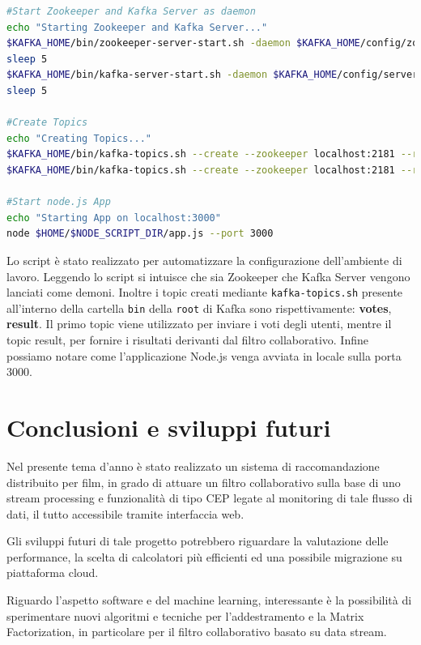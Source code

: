 \documentclass[12pt]{article}
\begin{document}
\begin{itemize}
\begin{lstlisting}[language=bash,caption=start.sh]
#Start Zookeeper and Kafka Server as daemon
echo "Starting Zookeeper and Kafka Server..."
$KAFKA_HOME/bin/zookeeper-server-start.sh -daemon $KAFKA_HOME/config/zookeeper.properties
sleep 5
$KAFKA_HOME/bin/kafka-server-start.sh -daemon $KAFKA_HOME/config/server.properties
sleep 5

#Create Topics
echo "Creating Topics..."
$KAFKA_HOME/bin/kafka-topics.sh --create --zookeeper localhost:2181 --replication-factor 1 --partitions 1 --topic votes
$KAFKA_HOME/bin/kafka-topics.sh --create --zookeeper localhost:2181 --replication-factor 1 --partitions 1 --topic result

#Start node.js App
echo "Starting App on localhost:3000"
node $HOME/$NODE_SCRIPT_DIR/app.js --port 3000
\end{lstlisting}
Lo script è stato realizzato per automatizzare la configurazione dell'ambiente di lavoro. Leggendo lo script si intuisce che sia Zookeeper che Kafka Server vengono lanciati come demoni. Inoltre i topic creati mediante \texttt{kafka-topics.sh} presente all'interno della cartella \texttt{bin} della \texttt{root} di Kafka sono rispettivamente: \textbf{votes}, \textbf{result}. Il primo topic viene utilizzato per inviare i voti degli utenti, mentre il topic result, per fornire i risultati derivanti dal filtro collaborativo.
Infine possiamo notare come l'applicazione Node.js venga avviata in locale sulla porta 3000.

\end{itemize}


\section{Conclusioni e sviluppi futuri}

Nel presente tema d'anno è stato realizzato un sistema di raccomandazione distribuito per film, in grado di attuare un filtro collaborativo sulla base di uno stream processing e funzionalità di tipo CEP legate al monitoring di tale flusso di dati, il tutto accessibile tramite interfaccia web. 

Gli sviluppi futuri di tale progetto potrebbero riguardare la valutazione delle performance, la scelta di calcolatori più efficienti ed una possibile migrazione su piattaforma cloud. 

Riguardo l'aspetto software e del machine learning, interessante è la possibilità di sperimentare nuovi algoritmi e tecniche per l'addestramento e la Matrix Factorization, in particolare per il filtro collaborativo basato su data stream.
\end{document}
